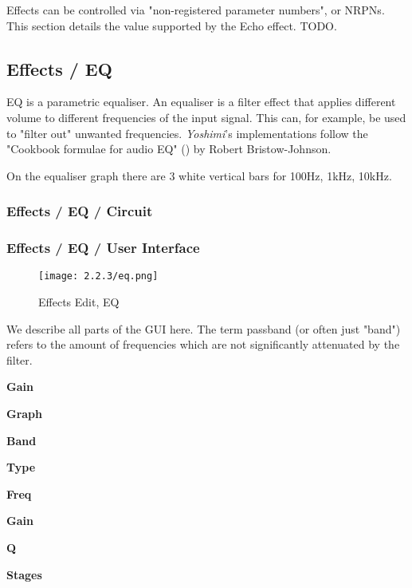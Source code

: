    Effects can be controlled via "non-registered parameter numbers", or NRPNs.
   This section details the value supported by the Echo effect.  TODO.

\subsection{Effects / EQ}
\label{subsec:effects_edit_eq}

   EQ is a parametric equaliser.
   An equaliser is a filter effect that applies different volume to different
   frequencies of the input signal. This can, for example, be used to "filter
   out" unwanted frequencies. \textsl{Yoshimi}’s implementations follow the
   "Cookbook formulae for audio EQ" (\cite{cookbookeq})
   by Robert Bristow-Johnson.

   On the equaliser graph there are 3 white
   vertical bars for 100Hz, 1kHz, 10kHz.

\subsubsection{Effects / EQ / Circuit}
\label{subsubsec:effects_edit_eq_circuit}

\iffalse
 No such figure:

 \begin{figure}[H]
    \centering
    \texttt{[image: zyn/effects/eq.png]}
    \caption{EQ Circuit Diagram}
    \label{fig:eq_circuit_diagram}
 \end{figure}
\fi

\subsubsection{Effects / EQ / User Interface}
\label{subsubsec:effects_edit_eq_ui}

\begin{figure}[H]
   \centering
   \texttt{[image: 2.2.3/eq.png]}
   \caption{Effects Edit, EQ}
   \label{fig:effects_edit_eq}
\end{figure}

   We describe all parts of the GUI here. The term passband (or often just
   "band") refers to the amount of frequencies which are not
   significantly attenuated by the filter.

   \begin{enumber}
      \item \textbf{Gain}
      \item \textbf{Graph}
      \item \textbf{Band}
      \item \textbf{Type}
      \item \textbf{Freq}
      \item \textbf{Gain}
      \item \textbf{Q}
      \item \textbf{Stages}
   \end{enumber}

